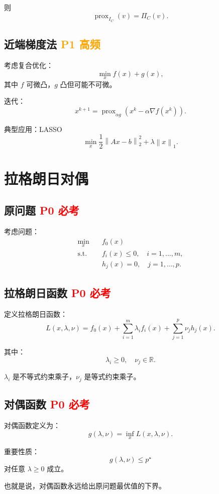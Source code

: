 \documentclass[11pt,a4paper]{ctexart}
\newcommand{\R}{\mathbb{R}}
\newcommand{\prox}{\operatorname{prox}}
\newcommand{\st}{\text{s.t.}}
\newcommand{\norm}[1]{\left\lVert #1 \right\rVert}
\newcommand{\Pzero}{\textcolor{red}{\textbf{P0 必考}}}
\newcommand{\Pone}{\textcolor{orange}{\textbf{P1 高频}}}
\theoremstyle{definition}
\theoremstyle{plain}
\theoremstyle{remark}
\begin{document}
则
\[
    \prox_{I_C}(v)=\Pi_C(v).
\]

\subsection{近端梯度法 \Pone}

考虑复合优化：
\[
    \min_x f(x)+g(x),
\]
其中 $f$ 可微凸，$g$ 凸但可能不可微。

迭代：
\[
    x^{k+1}
    =
    \prox_{\alpha g}
    \left(x^k-\alpha\nabla f(x^k)\right).
\]

典型应用：LASSO
\[
    \min_x \frac12\norm{Ax-b}_2^2+\lambda\norm{x}_1.
\]

\section{拉格朗日对偶}

\subsection{原问题 \Pzero}

考虑问题：
\[
\begin{aligned}
    \min_x\quad & f_0(x)\\
    \st\quad & f_i(x)\le0,\quad i=1,\dots,m,\\
    & h_j(x)=0,\quad j=1,\dots,p.
\end{aligned}
\]

\subsection{拉格朗日函数 \Pzero}

定义拉格朗日函数：
\[
    L(x,\lambda,\nu)
    =
    f_0(x)
    +
    \sum_{i=1}^m \lambda_i f_i(x)
    +
    \sum_{j=1}^p \nu_j h_j(x).
\]

其中：
\[
    \lambda_i\ge0,
    \quad
    \nu_j\in\R.
\]

$\lambda_i$ 是不等式约束乘子，$\nu_j$ 是等式约束乘子。

\subsection{对偶函数 \Pzero}

对偶函数定义为：
\[
    g(\lambda,\nu)
    =
    \inf_x L(x,\lambda,\nu).
\]

重要性质：
\[
    g(\lambda,\nu)\le p^\star
\]
对任意 $\lambda\ge0$ 成立。

也就是说，对偶函数永远给出原问题最优值的下界。
\end{document}
